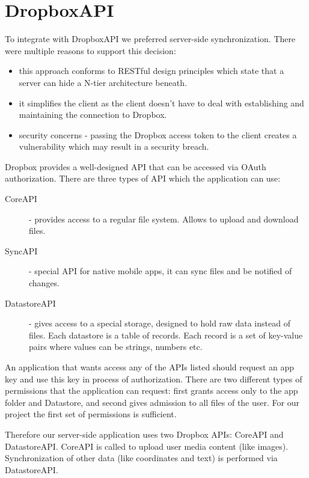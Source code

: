 \documentclass[12pt,a4paper]{article}
\begin{document}
\section{DropboxAPI}

To integrate with DropboxAPI we preferred server-side synchronization.
There were multiple reasons to support this decision:

\begin{itemize}
\item this approach conforms to RESTful design principles which state
  that a server can hide a N-tier architecture beneath.
\item it simplifies the client as the client doesn't have to deal with
  establishing and maintaining the connection to Dropbox.
\item security concerns - passing the Dropbox access token to the
  client creates a vulnerability which may result in a security breach.
\end{itemize}

Dropbox provides a well-designed API that can be accessed via OAuth
authorization. There are three types of API which the application can
use:

\begin{description}
\item[CoreAPI] - provides access to a regular file system. Allows to
  upload and download files.

\item[SyncAPI] - special API for native mobile apps, it can sync files
  and be notified of changes.

\item[DatastoreAPI] - gives access to a special storage, designed to
  hold raw data instead of files. Each datastore is a table of
  records. Each record is a set of key-value pairs where values can be
  strings, numbers etc.
\end{description}

An application that wants access any of the APIs listed should request
an app key and use this key in process of authorization. There are two
different types of permissions that the application can request: first
grants access only to the app folder and Datastore, and second gives
admission to all files of the user. For our project the first set of
permissions is sufficient.

Therefore our server-side application uses two Dropbox APIs: CoreAPI
and DatastoreAPI. CoreAPI is called to upload user media content (like
images). Synchronization of other data (like coordinates and text) is
performed via DatastoreAPI.
\end{document}
